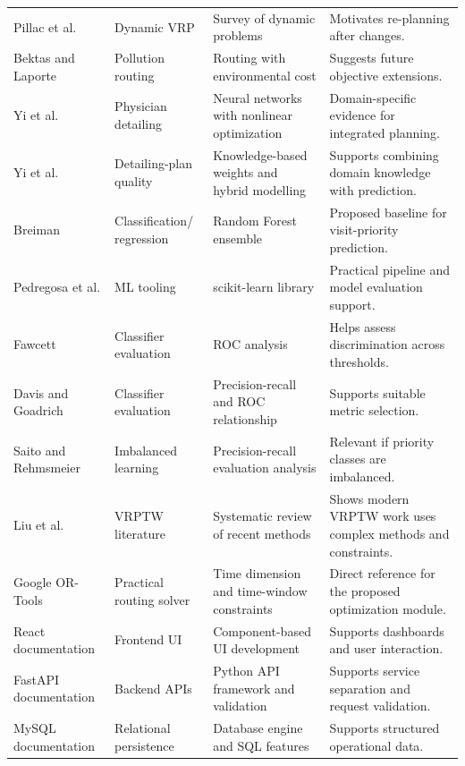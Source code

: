 \documentclass[12pt,a4paper,oneside]{report}
\begin{document}
\begin{longtable}{>{\RaggedRight\arraybackslash}p{30mm}>{\RaggedRight\arraybackslash}p{33mm}>{\RaggedRight\arraybackslash}p{35mm}>{\RaggedRight\arraybackslash}p{34mm}}
Pillac et al. \cite{pillac2013} & Dynamic VRP & Survey of dynamic problems & Motivates re-planning after changes.\\
Bektas and Laporte \cite{bektas2011} & Pollution routing & Routing with environmental cost & Suggests future objective extensions.\\
Yi et al. \cite{yi2003} & Physician detailing & Neural networks with nonlinear optimization & Domain-specific evidence for integrated planning.\\
Yi et al. \cite{yi2010} & Detailing-plan quality & Knowledge-based weights and hybrid modelling & Supports combining domain knowledge with prediction.\\
Breiman \cite{breiman2001} & \shortstack[l]{Classification/\\regression} & Random Forest ensemble & Proposed baseline for visit-priority prediction.\\
Pedregosa et al. \cite{pedregosa2011} & ML tooling & scikit-learn library & Practical pipeline and model evaluation support.\\
Fawcett \cite{fawcett2006} & Classifier evaluation & ROC analysis & Helps assess discrimination across thresholds.\\
Davis and Goadrich \cite{davis2006} & Classifier evaluation & Precision-recall and ROC relationship & Supports suitable metric selection.\\
Saito and Rehmsmeier \cite{saito2015} & Imbalanced learning & Precision-recall evaluation analysis & Relevant if priority classes are imbalanced.\\
Liu et al. \cite{liu2023} & VRPTW literature & Systematic review of recent methods & Shows modern VRPTW work uses complex methods and constraints.\\
Google OR-Tools \cite{ortoolsVRPTW} & Practical routing solver & Time dimension and time-window constraints & Direct reference for the proposed optimization module.\\
React documentation \cite{reactdocs} & Frontend UI & Component-based UI development & Supports dashboards and user interaction.\\
FastAPI documentation \cite{fastapidocs} & Backend APIs & Python API framework and validation & Supports service separation and request validation.\\
MySQL documentation \cite{mysqldocs} & Relational persistence & Database engine and SQL features & Supports structured operational data.\\
\bottomrule
\end{longtable}
\end{document}
